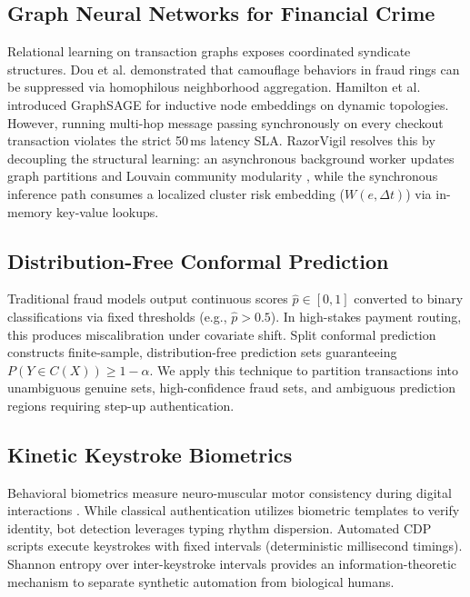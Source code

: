 \documentclass[conference]{IEEEtran}
\begin{document}
\subsection{Graph Neural Networks for Financial Crime}
Relational learning on transaction graphs exposes coordinated syndicate structures. Dou et al. \cite{dou2020enhancing} demonstrated that camouflage behaviors in fraud rings can be suppressed via homophilous neighborhood aggregation. Hamilton et al. \cite{hamilton2017graphsage} introduced GraphSAGE for inductive node embeddings on dynamic topologies. However, running multi-hop message passing synchronously on every checkout transaction violates the strict 50\,ms latency SLA. RazorVigil resolves this by decoupling the structural learning: an asynchronous background worker updates graph partitions and Louvain community modularity \cite{blondel2008fast}, while the synchronous inference path consumes a localized cluster risk embedding ($W(e, \Delta t)$) via in-memory key-value lookups.

\subsection{Distribution-Free Conformal Prediction}
Traditional fraud models output continuous scores $\hat{p} \in [0, 1]$ converted to binary classifications via fixed thresholds (e.g., $\hat{p} > 0.5$). In high-stakes payment routing, this produces miscalibration under covariate shift. Split conformal prediction \cite{angelopoulos2022gentle} constructs finite-sample, distribution-free prediction sets guaranteeing $P(Y \in C(X)) \ge 1 - \alpha$. We apply this technique to partition transactions into unambiguous genuine sets, high-confidence fraud sets, and ambiguous prediction regions requiring step-up authentication.

\subsection{Kinetic Keystroke Biometrics}
Behavioral biometrics measure neuro-muscular motor consistency during digital interactions \cite{morales2016keystroke}. While classical authentication utilizes biometric templates to verify identity, bot detection leverages typing rhythm dispersion. Automated CDP scripts execute keystrokes with fixed intervals (deterministic millisecond timings). Shannon entropy \cite{shannon1948mathematical} over inter-keystroke intervals provides an information-theoretic mechanism to separate synthetic automation from biological humans.
\end{document}
